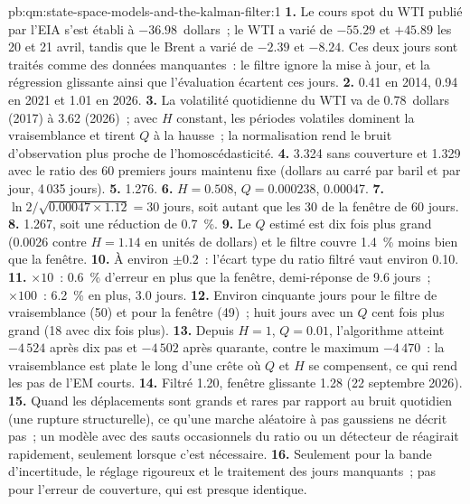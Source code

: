 \begin{solution}{pb:qm:state-space-models-and-the-kalman-filter:1}
\textbf{1.} Le cours spot du WTI publié par l'EIA s'est établi à $-36.98$~dollars~; le WTI a varié de $-55.29$ et $+45.89$ les 20 et 21 avril, tandis que le Brent a varié de $-2.39$ et $-8.24$.
Ces deux jours sont traités comme des données manquantes~: le filtre ignore la mise à jour, et la régression glissante ainsi que l'évaluation écartent ces jours.
\textbf{2.} 0.41 en 2014, 0.94 en 2021 et 1.01 en 2026.
\textbf{3.} La volatilité quotidienne du WTI va de 0.78~dollars (2017) à 3.62 (2026)~; avec $H$ constant, les périodes volatiles dominent la vraisemblance et tirent $Q$ à la hausse~;
la normalisation rend le bruit d'observation plus proche de l'homoscédasticité.
\textbf{4.} 3.324 sans couverture et 1.329 avec le ratio des 60 premiers jours maintenu fixe (dollars au carré par baril et par jour, 4\,035 jours).
\textbf{5.} 1.276.
\textbf{6.} $H = 0.508$, $Q = 0.000238$,  0.00047.
\textbf{7.} $\ln2/\sqrt{0.00047 \times 1.12} = 30$ jours, soit autant que les 30 de la fenêtre de 60 jours.
\textbf{8.} 1.267, soit une réduction de 0.7~\%.
\textbf{9.} Le $Q$ estimé est dix fois plus grand (0.0026 contre $H = 1.14$ en unités de dollars) et le filtre couvre 1.4~\% moins bien que la fenêtre.
\textbf{10.} À environ $\pm 0.2$~: l'écart type du ratio filtré vaut environ 0.10.
\textbf{11.} $\times 10$~: 0.6~\% d'erreur en plus que la fenêtre, demi-réponse de 9.6 jours~; $\times 100$~: 6.2~\% en plus, 3.0 jours.
\textbf{12.} Environ cinquante jours pour le filtre de vraisemblance (50) et pour la fenêtre (49)~; huit jours avec un $Q$ cent fois plus grand (18 avec dix fois plus).
\textbf{13.} Depuis $H = 1$, $Q = 0.01$, l'algorithme atteint $-4\,524$ après dix pas et $-4\,502$ après quarante, contre le maximum $-4\,470$~: la vraisemblance est plate le long d'une crête
où $Q$ et $H$ se compensent, ce qui rend les pas de l'EM courts.
\textbf{14.} Filtré 1.20, fenêtre glissante 1.28 (22 septembre 2026).
\textbf{15.} Quand les déplacements sont grands et rares par rapport au bruit quotidien (une rupture structurelle), ce qu'une marche aléatoire à pas gaussiens ne décrit pas~; un modèle avec
des sauts occasionnels du ratio ou un détecteur de  réagirait rapidement, seulement lorsque c'est nécessaire.
\textbf{16.} Seulement pour la bande d'incertitude, le réglage rigoureux et le traitement des jours manquants~; pas pour l'erreur de couverture, qui est presque identique.

\end{solution}
